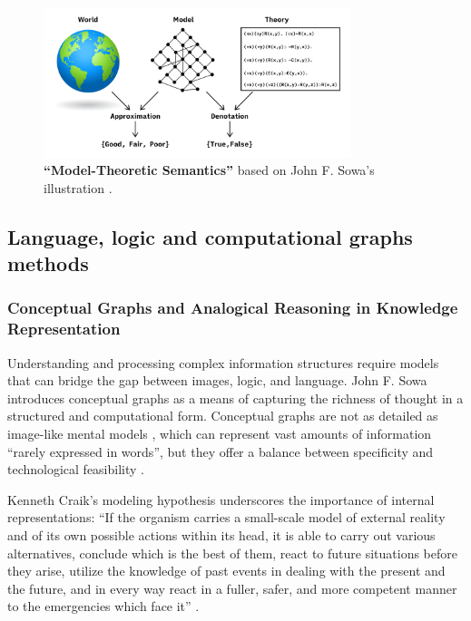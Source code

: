 \begin{figure}[h]
    \centering
    \includegraphics[width=0.8\textwidth]{figures/f3.png}
    \caption[Model-Theoretic Semantics]{\textbf{``Model-Theoretic Semantics”} based on John F. Sowa’s illustration \citep[p. 25]{sowa_semantics_2013}.}
    \label{f3}
\end{figure}

\subsection{Language, logic and computational graphs methods}
\subsubsection{Conceptual Graphs and Analogical Reasoning in Knowledge Representation}
Understanding and processing complex information structures require models that can bridge the gap between images, logic, and language. John F. Sowa introduces conceptual graphs as a means of capturing the richness of thought in a structured and computational form. Conceptual graphs are not as detailed as image-like mental models \citep[p. 61]{craik_nature_1952}, which can represent vast amounts of information ``rarely expressed in words”, but they offer a balance between specificity and technological feasibility \citep[p. 7]{sowa_goal_2008}.

Kenneth Craik's modeling hypothesis underscores the importance of internal representations: ``If the organism carries a small-scale model of external reality and of its own possible actions within its head, it is able to carry out various alternatives, conclude which is the best of them, react to future situations before they arise, utilize the knowledge of past events in dealing with the present and the future, and in every way react in a fuller, safer, and more competent manner to the emergencies which face it” \citep[p. 61]{craik_nature_1952}.

